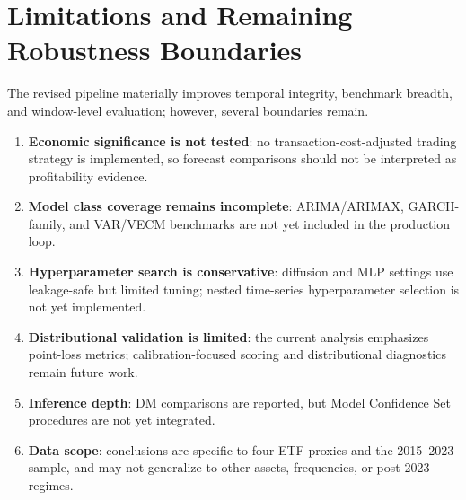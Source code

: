\section{Limitations and Remaining Robustness Boundaries}

The revised pipeline materially improves temporal integrity, benchmark breadth, and window-level evaluation; however, several boundaries remain.
\begin{enumerate}
  \item \textbf{Economic significance is not tested}: no transaction-cost-adjusted trading strategy is implemented, so forecast comparisons should not be interpreted as profitability evidence.
  \item \textbf{Model class coverage remains incomplete}: ARIMA/ARIMAX, GARCH-family, and VAR/VECM benchmarks are not yet included in the production loop.
  \item \textbf{Hyperparameter search is conservative}: diffusion and MLP settings use leakage-safe but limited tuning; nested time-series hyperparameter selection is not yet implemented.
  \item \textbf{Distributional validation is limited}: the current analysis emphasizes point-loss metrics; calibration-focused scoring and distributional diagnostics remain future work.
  \item \textbf{Inference depth}: DM comparisons are reported, but Model Confidence Set procedures \parencite{hansen2011} are not yet integrated.
  \item \textbf{Data scope}: conclusions are specific to four ETF proxies and the 2015--2023 sample, and may not generalize to other assets, frequencies, or post-2023 regimes.
\end{enumerate}
